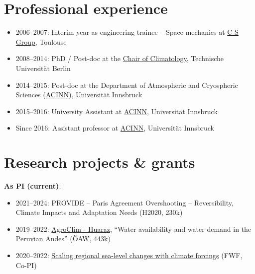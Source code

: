 \section*{Professional experience}
\label{\detokenize{ch08/cv:professional-experience}}\begin{itemize}[nosep]
\item {} 
2006--2007: Interim year as engineering trainee -- Space mechanics at \href{https://www.c-s.fr}{C-S Group}, Toulouse

\item {} 
2008--2014: PhD / Post-doc at the \href{http://klima.tu-berlin.de}{Chair of Climatology}, Technische Universität Berlin

\item {} 
2014--2015: Post-doc at the Department of Atmospheric and Cryospheric Sciences (\href{https://www.uibk.ac.at/acinn}{ACINN}), Universität Innsbruck

\item {} 
2015--2016: University Assistant at \href{https://www.uibk.ac.at/acinn}{ACINN}, Universität Innsbruck

\item {} 
Since 2016: Assistant professor at \href{https://www.uibk.ac.at/acinn}{ACINN}, Universität Innsbruck

\end{itemize}


\section*{Research projects \& grants}
\label{\detokenize{ch08/cv:research-projects-grants}}
\textbf{As PI (current)}:
\begin{itemize}[nosep]
\item {} 
2021--2024: PROVIDE -- Paris Agreement Overshooting -- Reversibility, Climate Impacts and Adaptation Needs (H2020, 230k\texteuro{})

\item {} 
2019--2022: \href{https://agroclim-huaraz.info/}{AgroClim - Huaraz}, “Water availability and water demand in the Peruvian Andes” (ÖAW, 443k\texteuro{})

\item {} 
2020--2022: \href{https://www.uibk.ac.at/acinn/research/ice-and-climate/projects/scaling\_regional\_sea\_level\_changes.html.en}{Scaling regional sea-level changes with climate forcings} (FWF, Co-PI)

\end{itemize}

